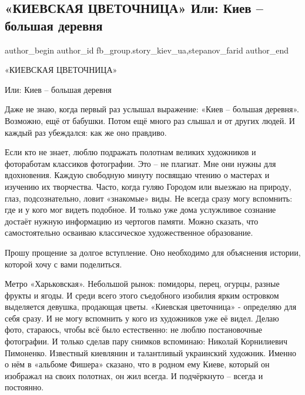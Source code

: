 
 
 
 
 
 
\subsection{«КИЕВСКАЯ ЦВЕТОЧНИЦА» Или: Киев – большая деревня}
\label{sec:15_09_2021.fb.fb_group.story_kiev_ua.1.kiev_derevnja_cvetochnica}


\ifcmt
 author_begin
   author_id fb_group.story_kiev_ua,stepanov_farid
 author_end
\fi


«КИЕВСКАЯ ЦВЕТОЧНИЦА»

Или: Киев – большая деревня

Даже не знаю, когда первый раз услышал выражение: «Киев – большая деревня».
Возможно, ещё от бабушки. Потом ещё много раз слышал и от других людей. И
каждый раз убеждался: как же оно правдиво.

Если кто не знает, люблю подражать полотнам великих художников и фотоработам
классиков фотографии. Это – не плагиат. Мне они нужны для вдохновения. Каждую
свободную минуту посвящаю чтению о мастерах и изучению их творчества. Часто,
когда гуляю Городом или выезжаю на природу, глаз, подсознательно, ловит
«знакомые» виды. Не всегда сразу могу вспомнить: где и у кого мог видеть
подобное. И только уже дома услужливое сознание достаёт нужную информацию из
чертогов памяти. Можно сказать, что самостоятельно осваиваю классическое
художественное образование.

Прошу прощение за долгое вступление. Оно необходимо для объяснения истории,
которой хочу с вами поделиться.

Метро «Харьковская». Небольшой рынок: помидоры, перец, огурцы, разные фрукты и
ягоды. И среди всего этого съедобного изобилия ярким островком выделяется
девушка, продающая цветы. «Киевская цветочница» - определяю для себя сразу. И
не могу вспомнить у кого из художников уже её видел. Делаю фото, стараюсь,
чтобы всё было естественно: не люблю постановочные фотографии. И только сделав
пару снимков вспоминаю: Николай Корнилиевич Пимоненко. Известный киевлянин и
талантливый украинский художник. Именно о нём в «альбоме Фишера» сказано, что в
родном ему Киеве, который он изображал на своих полотнах, он жил всегда. И
подчёркнуто – всегда и постоянно.

